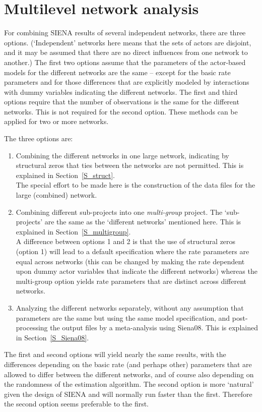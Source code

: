 \documentclass[a4paper,fleqn]{article}
\newcommand{\+}{\, + \,}
\newcommand{\SI}{{\sf SIENA }}
\begin{document}
{\newpage
\section{Multilevel network analysis}
\label{S_mulev}

For combining \SI results of several independent networks,
there are three options.
(`Independent'  networks here means that the sets of actors are
disjoint, and it may be assumed that there are no direct influences
from one network to another.)
The first two options assume that the parameters
of the actor-based models for the different
networks are the same -- except
for the basic rate parameters and for
those differences that are explicitly modeled by interactions
with dummy variables indicating the different networks.
The first and third options require that the number of observations is the same
for the different networks. This is not required for the
second option.
These methods can be applied for two or more networks.
\medskip

\noindent
The three options are:
\begin{enumerate}
\item Combining the different networks in one large network,
      indicating by structural zeros that ties between the
      networks are not permitted. This is explained in Section~\ref{S_struct}.\\
      The special effort to be made here is the construction
      of the data files for the large (combined) network.
\item Combining different sub-projects
      into one \emph{multi-group} project.
      The `sub-projects' are the same as the `different networks'
      mentioned here.
      This is explained in Section~\ref{S_multigroup}.\\
      A difference between options 1 and 2 is that the use
      of structural zeros (option 1) will lead to a default specification
      where the rate parameters are equal across networks
      (this can be changed by making the rate dependent upon dummy actor
      variables that indicate the different networks)
      whereas the multi-group option yields rate parameters
      that are distinct across different networks.
\item Analyzing the different networks separately, without any assumption
      that parameters are the same but using the same model specification,
      and post-processing the output files by a meta-analysis
      using \textsf{Siena08}.
      This is explained in Section~\ref{S_Siena08}.
\end{enumerate}
The first and second options will yield nearly the same results, with the
differences depending on the basic rate (and perhaps other) parameters that are
allowed to differ between the different networks, and of course
also depending on the randomness of the estimation algorithm.
The second option is more `natural' given the design of \SI and
will normally run faster than the first.
Therefore the second option seems preferable to the first.

}
\end{document}
